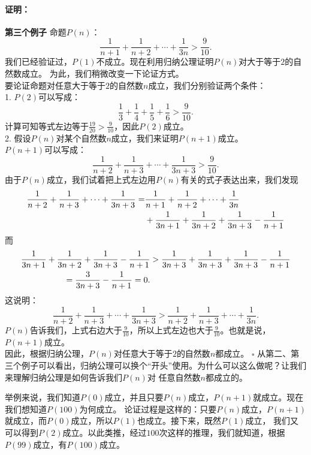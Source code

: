 \documentclass[12pt,UTF8]{ctexbook}
\newenvironment{proof2}{\paragraph{\textbf{证明：}}}{\hfill$\square$}
\begin{document}
\begin{proof2}{\textbf{第三个例子 }}
    命题$P(n)$：
    $$ \frac{1}{n+1} + \frac{1}{n+2} + \cdots + \frac{1}{3n} > \frac{9}{10}. $$
    我们已经验证过，$P(1)$不成立。现在利用归纳公理证明$P(n)$对大于等于$2$的自然数成立。
    为此，我们稍微改变一下论证方式。\\
    要论证命题对任意大于等于$2$的自然数$n$成立，我们分别验证两个条件：\\
    1. $P(2)$可以写成：
    $$\frac13 + \frac14 + \frac15 + \frac16 > \frac{9}{10}.$$
    计算可知等式左边等于$\frac{19}{20} > \frac{9}{10}$，因此$P(2)$成立。\\
    2. 假设$P(n)$对某个自然数$n$成立，我们来证明$P(n+1)$成立。\\
    $P(n+1)$可以写成：
    $$ \frac{1}{n+2} + \frac{1}{n+3} + \cdots + \frac{1}{3n+3} > \frac{9}{10}. $$
    由于$P(n)$成立，我们试着把上式左边用$P(n)$有关的式子表达出来，我们发现
    \begin{align}
        \frac{1}{n+2} + \frac{1}{n+3} + \cdots + \frac{1}{3n+3} =& \frac{1}{n+1} + \frac{1}{n+2} + \cdots + \frac{1}{3n} \notag \\
        &+ \frac{1}{3n+1} + \frac{1}{3n+2} + \frac{1}{3n+3} - \frac{1}{n+1} \notag 
    \end{align}
    而
    \begin{align}
        \frac{1}{3n+1} + \frac{1}{3n+2} + \frac{1}{3n+3} - \frac{1}{n+1} &>  \frac{1}{3n+3} + \frac{1}{3n+3} + \frac{1}{3n+3} - \frac{1}{n+1} \notag \\
        = \frac{3}{3n+3} - \frac{1}{n+1} = 0. \notag 
    \end{align}
    这说明：
    $$ \frac{1}{n+2} + \frac{1}{n+3} + \cdots + \frac{1}{3n+3} > \frac{1}{n+2} + \frac{1}{n+3} + \cdots + \frac{1}{3n}. $$
    $P(n)$告诉我们，上式右边大于$\frac{9}{10}$，所以上式左边也大于$\frac{9}{10}$。也就是说，$P(n+1)$成立。\\
    因此，根据归纳公理，$P(n)$对任意大于等于$2$的自然数$n$都成立。    
\end{proof2}
从第二、第三个例子可以看出，归纳公理可以换个“开头”使用。为什么可以这么做呢？让我们来理解归纳公理是如何告诉我们$P(n)$对
任意自然数$n$都成立的。

举例来说，我们知道$P(0)$成立，并且只要$P(n)$成立，$P(n+1)$就成立。现在我们想知道$P(100)$为何成立。
论证过程是这样的：只要$P(n)$成立，$P(n+1)$就成立，而$P(0)$成立，所以$P(1)$也成立。接下来，既然$P(1)$成立，
我们又可以得到$P(2)$成立。以此类推，经过$100$次这样的推理，我们就知道，根据$P(99)$成立，有$P(100)$成立。
\end{document}
